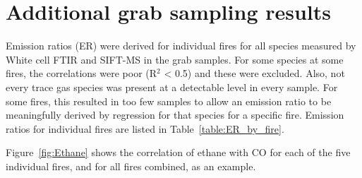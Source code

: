 \documentclass[acp, manuscript]{copernicus}
\begin{document}
\section{Additional grab sampling results} 
Emission ratios (ER) were derived for individual fires for all species measured by White cell FTIR and SIFT-MS in the grab samples. For some species at some fires, the correlations were poor (R$^2$ < 0.5) and these were excluded. Also, not every trace gas species was present at a detectable level in every sample. For some fires, this resulted in too few samples to allow an emission ratio to be meaningfully derived by regression for that species for a specific fire. Emission ratios for individual fires are listed in Table~\ref{table:ER_by_fire}.

Figure~\ref{fig:Ethane} shows the correlation of ethane with CO for each of the five individual fires, and for all fires combined, as an example. 
\end{document}
